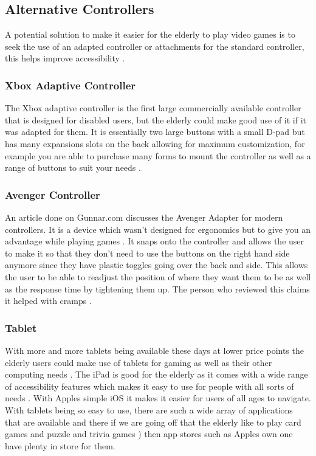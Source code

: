 \documentclass[journal]{IEEEtran}
\begin{document}
\subsection{Alternative Controllers}
A potential solution to make it easier for the elderly to play video games is to seek the use of an adapted controller or attachments for the standard controller, this helps improve accessibility \cite{noauthor_xbox_nodate-1}.
\subsubsection{Xbox Adaptive Controller}
The Xbox adaptive controller \cite{noauthor_xbox_2018} is the first large commercially available controller that is designed for disabled users, but the elderly could make good use of it if it was adapted for them. It is essentially two large buttons with a small D-pad but has many expansions slots on the back allowing for maximum customization, for example you are able to purchase many forms to mount the controller as well as a range of buttons to suit your needs \cite{noauthor_xbox_nodate}.

\subsubsection{Avenger Controller}
An article done on Gunnar.com \cite{noauthor_ergonomics_2012} discusses the Avenger Adapter \cite{noauthor_avenger_nodate} for modern controllers. It is a device which wasn't designed for ergonomics \cite{noauthor_ergonomics_2012} but to give you an advantage while playing games \cite{noauthor_avenger_nodate}. It snaps onto the controller and allows the user to make it so that they don't need to use the buttons on the right hand side anymore since they have plastic toggles going over the back and side. This allows the user to be able to readjust the position of where they want them to be as well as the response time by tightening them up. The person who reviewed this claims it helped with cramps \cite{noauthor_avenger_nodate}.

\subsubsection{Tablet}
With more and more tablets being available these days at lower price points the elderly users could make use of tablets for gaming as well as their other computing needs \cite{noauthor_safest_2014}. The iPad is good for the elderly as it comes with a wide range of accessibility features which makes it easy to use for people with all sorts of needs \cite{noauthor_accessibility_nodate}. With Apples simple iOS \cite{noauthor_3_nodate} it makes it easier for users of all ages to navigate. With tablets being so easy to use, there are such a wide array of applications that are available and there if we are going off that the elderly like to play card games and puzzle and trivia games \cite{noauthor_nearly_nodate}) then app stores such as Apples own one \cite{noauthor_app_nodate} have plenty in store for them.
\end{document}
